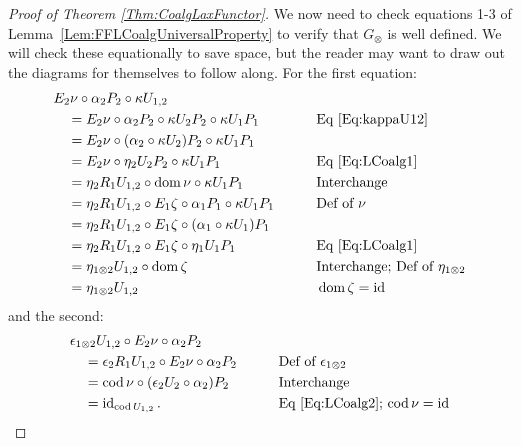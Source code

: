 \begin{proof}[Proof of Theorem \ref{Thm:CoalgLaxFunctor}]
	We now need to check equations 1-3 of Lemma~\ref{Lem:FFLCoalgUniversalProperty} to verify that $G_{\otimes}$ is well defined. We will check these equationally to save space, but the reader may want to draw out the diagrams for themselves to follow along. For the first equation:
	\begin{alignat*}{2}
		\hspace{1em}&\hspace{-1em} E_2\nu \circ \alpha_2P_2 \circ \kappa U_{1,2} && \\
		&= E_2\nu \circ \alpha_2P_2 \circ \kappa U_2P_2 \circ \kappa U_1P_1 
			&& \text{Eq \eqref{Eq:kappaU12}} \\
		&= E_2\nu \circ (\alpha_2\circ\kappa U_2)P_2 \circ \kappa U_1P_1 && \\
		&= E_2\nu \circ \eta_2U_2P_2 \circ \kappa U_1P_1 
			&& \text{Eq \eqref{Eq:LCoalg1}} \\
		&= \eta_2R_1U_{1,2} \circ \operatorname{dom}\nu \circ \kappa U_1P_1 
			&& \text{Interchange} \\
		&= \eta_2R_1U_{1,2} \circ E_1\zeta \circ \alpha_1P_1 \circ \kappa U_1P_1 
			&\qquad& \text{Def of $\nu$} \\
		&= \eta_2R_1U_{1,2} \circ E_1\zeta \circ (\alpha_1\circ\kappa U_1)P_1 && \\
		&= \eta_2R_1U_{1,2} \circ E_1\zeta \circ \eta_1U_1P_1 
			&&\text{Eq \eqref{Eq:LCoalg1}} \\
		&= \eta_{1\otimes 2}U_{1,2} \circ \operatorname{dom}\zeta 
			&&\text{Interchange; Def of $\eta_{1\otimes 2}$} \\
		&= \eta_{1\otimes 2}U_{1,2} 
			&&\operatorname{dom}\zeta=\operatorname{id}
	\end{alignat*}
	and the second:
	\begin{alignat*}{2}
		\hspace{1em}&\hspace{-1em} \epsilon_{1\otimes 2}U_{1,2} \circ E_2\nu \circ \alpha_2P_2 && \\
		&= \epsilon_2R_1U_{1,2} \circ E_2\nu \circ \alpha_2P_2  
			&& \text{Def of $\epsilon_{1\otimes2}$} \\
		&= \operatorname{cod}\nu \circ (\epsilon_2U_2\circ\alpha_2)P_2 
			&\qquad& \text{Interchange} \\
		&= \operatorname{id}_{\operatorname{cod} U_{1,2}}. 
			&&\text{Eq \eqref{Eq:LCoalg2}; $\operatorname{cod}\nu=\operatorname{id}$}
	\end{alignat*}


\end{proof}
